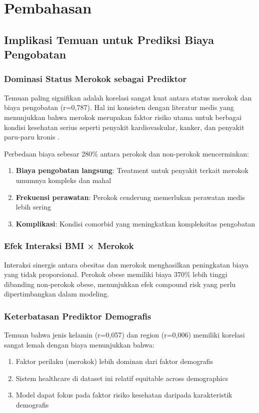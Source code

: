 \section{Pembahasan}
\label{sec:pembahasan}

\subsection{Implikasi Temuan untuk Prediksi Biaya Pengobatan}
\label{subsec:implikasi-temuan}

\subsubsection{Dominasi Status Merokok sebagai Prediktor}
Temuan paling signifikan adalah korelasi sangat kuat antara status merokok dan biaya pengobatan (r=0,787). Hal ini konsisten dengan literatur medis yang menunjukkan bahwa merokok merupakan faktor risiko utama untuk berbagai kondisi kesehatan serius seperti penyakit kardiovaskular, kanker, dan penyakit paru-paru kronis \cite{world_health_organization_tobacco_2021}.

Perbedaan biaya sebesar 280\% antara perokok dan non-perokok mencerminkan:
\begin{enumerate}
    \item \textbf{Biaya pengobatan langsung}: Treatment untuk penyakit terkait merokok umumnya kompleks dan mahal
    \item \textbf{Frekuensi perawatan}: Perokok cenderung memerlukan perawatan medis lebih sering
    \item \textbf{Komplikasi}: Kondisi comorbid yang meningkatkan kompleksitas pengobatan
\end{enumerate}

\subsubsection{Efek Interaksi BMI × Merokok}
Interaksi sinergis antara obesitas dan merokok menghasilkan peningkatan biaya yang tidak proporsional. Perokok obese memiliki biaya 370\% lebih tinggi dibanding non-perokok obese, menunjukkan efek compound risk yang perlu dipertimbangkan dalam modeling.

\subsubsection{Keterbatasan Prediktor Demografis}
Temuan bahwa jenis kelamin (r=0,057) dan region (r=0,006) memiliki korelasi sangat lemah dengan biaya menunjukkan bahwa:
\begin{enumerate}
    \item Faktor perilaku (merokok) lebih dominan dari faktor demografis
    \item Sistem healthcare di dataset ini relatif equitable across demographics
    \item Model dapat fokus pada faktor risiko kesehatan daripada karakteristik demografis
\end{enumerate}

